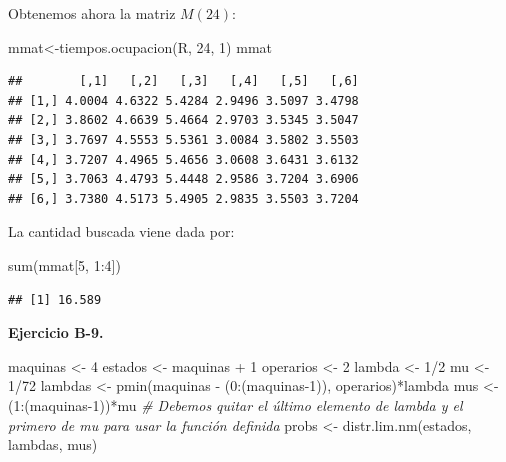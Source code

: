 \documentclass[
]{book}
\newenvironment{Shaded}{\begin{snugshade}}{\end{snugshade}}
\newcommand{\CommentTok}[1]{\textcolor[rgb]{0.56,0.35,0.01}{\textit{#1}}}
\newcommand{\DecValTok}[1]{\textcolor[rgb]{0.00,0.00,0.81}{#1}}
\newcommand{\FunctionTok}[1]{\textcolor[rgb]{0.00,0.00,0.00}{#1}}
\newcommand{\NormalTok}[1]{#1}
\newcommand{\OtherTok}[1]{\textcolor[rgb]{0.56,0.35,0.01}{#1}}
\newcommand{\SpecialCharTok}[1]{\textcolor[rgb]{0.00,0.00,0.00}{#1}}
\theoremstyle{definition}
\theoremstyle{definition}
\theoremstyle{definition}
\theoremstyle{definition}
\theoremstyle{remark}
\begin{document}
Obtenemos ahora la matriz \(M(24)\):

\begin{Shaded}
\begin{Highlighting}[]
\NormalTok{mmat}\OtherTok{\textless{}{-}}\FunctionTok{tiempos.ocupacion}\NormalTok{(R, }\DecValTok{24}\NormalTok{, }\DecValTok{1}\NormalTok{)}
\NormalTok{mmat}
\end{Highlighting}
\end{Shaded}

\begin{verbatim}
##        [,1]   [,2]   [,3]   [,4]   [,5]   [,6]
## [1,] 4.0004 4.6322 5.4284 2.9496 3.5097 3.4798
## [2,] 3.8602 4.6639 5.4664 2.9703 3.5345 3.5047
## [3,] 3.7697 4.5553 5.5361 3.0084 3.5802 3.5503
## [4,] 3.7207 4.4965 5.4656 3.0608 3.6431 3.6132
## [5,] 3.7063 4.4793 5.4448 2.9586 3.7204 3.6906
## [6,] 3.7380 4.5173 5.4905 2.9835 3.5503 3.7204
\end{verbatim}

La cantidad buscada viene dada por:

\begin{Shaded}
\begin{Highlighting}[]
\FunctionTok{sum}\NormalTok{(mmat[}\DecValTok{5}\NormalTok{, }\DecValTok{1}\SpecialCharTok{:}\DecValTok{4}\NormalTok{])}
\end{Highlighting}
\end{Shaded}

\begin{verbatim}
## [1] 16.589
\end{verbatim}

\textbf{Ejercicio B-9.}

\begin{Shaded}
\begin{Highlighting}[]
\NormalTok{maquinas }\OtherTok{\textless{}{-}} \DecValTok{4}
\NormalTok{estados }\OtherTok{\textless{}{-}}\NormalTok{ maquinas }\SpecialCharTok{+} \DecValTok{1}
\NormalTok{operarios }\OtherTok{\textless{}{-}} \DecValTok{2}
\NormalTok{lambda }\OtherTok{\textless{}{-}} \DecValTok{1}\SpecialCharTok{/}\DecValTok{2}
\NormalTok{mu }\OtherTok{\textless{}{-}} \DecValTok{1}\SpecialCharTok{/}\DecValTok{72}
\NormalTok{lambdas }\OtherTok{\textless{}{-}} \FunctionTok{pmin}\NormalTok{(maquinas }\SpecialCharTok{{-}}\NormalTok{ (}\DecValTok{0}\SpecialCharTok{:}\NormalTok{(maquinas}\DecValTok{{-}1}\NormalTok{)), operarios)}\SpecialCharTok{*}\NormalTok{lambda}
\NormalTok{mus }\OtherTok{\textless{}{-}}\NormalTok{ (}\DecValTok{1}\SpecialCharTok{:}\NormalTok{(maquinas}\DecValTok{{-}1}\NormalTok{))}\SpecialCharTok{*}\NormalTok{mu}
\CommentTok{\# Debemos quitar el último elemento de lambda y el primero de mu para usar la función definida}
\NormalTok{probs }\OtherTok{\textless{}{-}} \FunctionTok{distr.lim.nm}\NormalTok{(estados, lambdas, mus)}
\end{Highlighting}
\end{Shaded}
\end{document}
